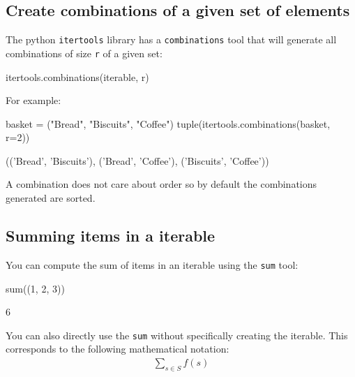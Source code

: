 \subsection{Create combinations of a given set of elements}
\label{\detokenize{tools-for-mathematics/05-combinations-permutations/how/main:creating-combinations-of-a-given-set-of-elements}}

The python \texttt{itertools} library has a \texttt{combinations} tool that
will generate all combinations of size \texttt{r} of a given set:


\begin{api}
itertools.combinations(iterable, r)
\end{api}



For example:




\begin{pyin}
basket = ("Bread", "Biscuits", "Coffee")
tuple(itertools.combinations(basket, r=2))
\end{pyin}





\begin{raw}
(('Bread', 'Biscuits'), ('Bread', 'Coffee'), ('Biscuits', 'Coffee'))
\end{raw}





A combination does not care about order so by default the combinations generated
are sorted.


\subsection{Summing items in a iterable}

You can compute the sum of items in an iterable using the \texttt{sum} tool:




\begin{pyin}
sum((1, 2, 3))
\end{pyin}





\begin{raw}
6
\end{raw}





You can also directly use the \texttt{sum} without specifically creating the
iterable. This
corresponds to the following mathematical notation:
\begin{equation*}
\begin{split}
    \sum_{s\in S}f(s)
\end{split}
\end{equation*}

